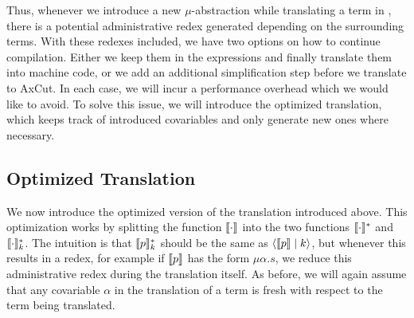 Thus, whenever we introduce a new $\mu$-abstraction while translating a term in \surfacelang{}, there is a potential administrative redex generated  depending on the surrounding terms.
With these redexes included, we have two options on how to continue compilation. 
Either we keep them in the expressions and finally translate them into machine code, or we add an additional simplification step before we translate \targetlang{} to AxCut.
In each case, we will incur a performance overhead which we would like to avoid. 
To solve this issue, we will introduce the optimized translation, which keeps track of introduced covariables and only generate new ones where necessary.


\subsection{Optimized Translation}
\label{subsec:translation:optimized}
We now introduce the optimized version of the translation introduced above.
This optimization works by splitting the function $\llbracket \cdot \rrbracket$ into the two functions $\llbracket \cdot \rrbracket_{}^{\ast}$ and $\llbracket \cdot \rrbracket_{k}^{\ast}$.
The intuition is that $\llbracket p \rrbracket_{k}^{\ast}$ should be the same as $\langle \llbracket p \rrbracket \mid k \rangle$, but whenever this results in a redex, for example if $\llbracket p \rrbracket$ has the form $\mu \alpha.s$, we reduce this administrative redex during the translation itself.
As before, we will again assume that any covariable $\alpha$ in the translation of a term is fresh with respect to the term being translated.

